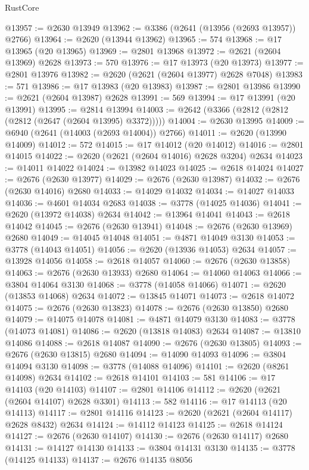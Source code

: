 \begin{lexlean}{RustCore}
\begin{coremodule}
@13957 := @2630 @13949
@13962 := @3386 (@2641 (@13956 (@2693 @13957)) @2766)
@13964 := @2620 (@13944 @13962)
@13965 := 574
@13968 := @17 @13965 (@20 @13965)
@13969 := @2801 @13968
@13972 := @2621 (@2604 @13969) @2628
@13973 := 570
@13976 := @17 @13973 (@20 @13973)
@13977 := @2801 @13976
@13982 := @2620 (@2621 (@2604 @13977) @2628 @7048)
@13983 := 571
@13986 := @17 @13983 (@20 @13983)
@13987 := @2801 @13986
@13990 := @2621 (@2604 @13987) @2628
@13991 := 569
@13994 := @17 @13991 (@20 @13991)
@13995 := @2814 @13994
@14003 := @2642 (@3366 (@2812 (@2812 (@2812 (@2647 (@2604 @13995) @3372)))))
@14004 := @2630 @13995
@14009 := @6940 (@2641 (@14003 (@2693 @14004)) @2766)
@14011 := @2620 (@13990 @14009)
@14012 := 572
@14015 := @17 @14012 (@20 @14012)
@14016 := @2801 @14015
@14022 := @2620 (@2621 (@2604 @14016) @2628 @3204) @2634
@14023 := @14011 @14022
@14024 := @13982 @14023
@14025 := @2618 @14024
@14027 := @2676 (@2630 @13977)
@14029 := @2676 (@2630 @13987)
@14032 := @2676 (@2630 @14016) @2680
@14033 := @14029 @14032
@14034 := @14027 @14033
@14036 := @4601 @14034 @2683
@14038 := @3778 (@14025 @14036)
@14041 := @2620 (@13972 @14038) @2634
@14042 := @13964 @14041
@14043 := @2618 @14042
@14045 := @2676 (@2630 @13941)
@14048 := @2676 (@2630 @13969) @2680
@14049 := @14045 @14048
@14051 := @4871 @14049 @3130
@14053 := @3778 (@14043 @14051)
@14056 := @2620 (@13936 @14053) @2634
@14057 := @13928 @14056
@14058 := @2618 @14057
@14060 := @2676 (@2630 @13858)
@14063 := @2676 (@2630 @13933) @2680
@14064 := @14060 @14063
@14066 := @3804 @14064 @3130
@14068 := @3778 (@14058 @14066)
@14071 := @2620 (@13853 @14068) @2634
@14072 := @13845 @14071
@14073 := @2618 @14072
@14075 := @2676 (@2630 @13823)
@14078 := @2676 (@2630 @13850) @2680
@14079 := @14075 @14078
@14081 := @4871 @14079 @3130
@14083 := @3778 (@14073 @14081)
@14086 := @2620 (@13818 @14083) @2634
@14087 := @13810 @14086
@14088 := @2618 @14087
@14090 := @2676 (@2630 @13805)
@14093 := @2676 (@2630 @13815) @2680
@14094 := @14090 @14093
@14096 := @3804 @14094 @3130
@14098 := @3778 (@14088 @14096)
@14101 := @2620 (@8261 @14098) @2634
@14102 := @2618 @14101
@14103 := 581
@14106 := @17 @14103 (@20 @14103)
@14107 := @2801 @14106
@14112 := @2620 (@2621 (@2604 @14107) @2628 @3301)
@14113 := 582
@14116 := @17 @14113 (@20 @14113)
@14117 := @2801 @14116
@14123 := @2620 (@2621 (@2604 @14117) @2628 @8432) @2634
@14124 := @14112 @14123
@14125 := @2618 @14124
@14127 := @2676 (@2630 @14107)
@14130 := @2676 (@2630 @14117) @2680
@14131 := @14127 @14130
@14133 := @3804 @14131 @3130
@14135 := @3778 (@14125 @14133)
@14137 := @2676 @14135 @8056

\end{coremodule}
\end{lexlean}
